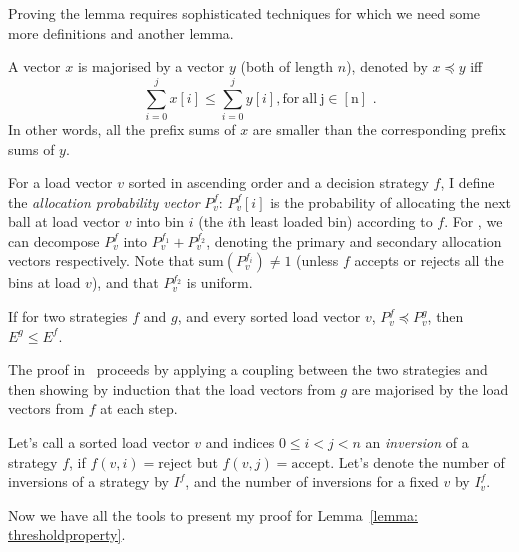 Proving the lemma requires sophisticated techniques for which we need some more definitions and another lemma.


\begin{definition} [majorisation]
A vector $x$ is majorised by a vector $y$ (both of length $n$), denoted by $x \preccurlyeq y$ iff $$\sum_{i=0}^j x[i] \leq \sum_{i=0}^j y[i]\mathrm{, for\ all\ j\in [n]} \text{ .}$$In other words, all the prefix sums of $x$ are smaller than the corresponding prefix sums of $y$.
\end{definition}


\begin{definition} 
For a load vector $v$ sorted in ascending order and a decision strategy $f$, I define the \textit{allocation probability vector} $P^f_v$: $P^f_v[i]$ is the probability of allocating the next ball at load vector $v$ into bin $i$ (the $i$th least loaded bin) according to $f$. For \TwoThinning, we can decompose $P^f_v$ into $P^{f_1}_{v}+P^{f_2}_{v}$, denoting the primary and secondary allocation vectors respectively. Note that $\mathrm{sum}(P^{f_i}_{v})\neq 1$ (unless $f$ accepts or rejects all the bins at load $v$), and that $P^{f_2}_{v}$ is uniform.
\end{definition}


\begin{lemma}  \label{lemma: majorisation-implies-better}
If for two strategies $f$ and $g$, and every sorted load vector $v$, $P^f_v\preccurlyeq P^g_v$, then $E^g\leq E^f$.
\end{lemma}

\begin{remark}
The proof in~\cite{azar1999twochoice} proceeds by applying a coupling between the two strategies and then showing by induction that the load vectors from $g$ are majorised by the load vectors from $f$ at each step.
\end{remark}


\begin{definition} 
Let's call a sorted load vector $v$ and indices $0\leq i<j<n$ an \textit{inversion} of a strategy $f$, if $f(v,i)=\mathrm{reject}$ but $f(v,j)=\mathrm{accept}$. Let's denote the number of inversions of a strategy by $I^f$, and the number of inversions for a fixed $v$ by $I^f_v$.
\end{definition}


Now we have all the tools to present my proof for Lemma~\ref{lemma: thresholdproperty}.

